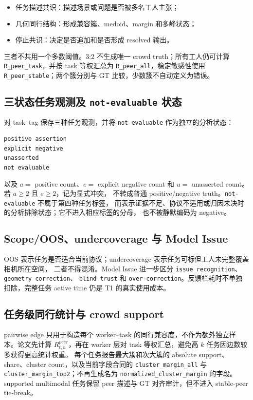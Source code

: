 \begin{itemize}
  \item 任务描述共识：描述场景或问题是否被多名工人主张；
  \item 几何同行结构：形成兼容簇、medoid、margin 和多峰状态；
  \item 停止共识：决定是否追加和是否形成 resolved 输出。
\end{itemize}

三者不共用一个多数阈值。3:2 不生成唯一 crowd truth；所有工人仍可计算
\texttt{R\_peer\_task}，并按 task 等权汇总为 \texttt{R\_peer\_all}，稳定敏感性使用
\texttt{R\_peer\_stable}；两个簇分别与 GT 比较，少数簇不自动定义为错误。

\subsection{三状态任务观测及 \texttt{not-evaluable} 状态}

对 task--tag 保存三种任务观测，并将 \texttt{not-evaluable} 作为独立的分析状态：

\begin{verbatim}
positive assertion
explicit negative
unasserted
not evaluable
\end{verbatim}

以及 \(a=\) positive count、\(e=\) explicit negative count 和
\(u=\) unasserted count。若 \(a\geq2\) 且 \(e\geq2\)，记为显式冲突，
不转成普通 positive/negative truth。\texttt{not-evaluable} 不属于第四种任务标签，
而表示证据不足、协议不适用或归因未决时的分析排除状态；它不进入相应标签的分母，
也不被静默编码为 negative。

\subsection{Scope/OOS、undercoverage 与 Model Issue}

OOS 表示任务是否适合当前协议；undercoverage 表示任务可标但工人未完整覆盖相机所在空间，
二者不得混淆。Model Issue 进一步区分 \texttt{issue recognition}、\texttt{geometry correction}、
\texttt{blind trust} 和 \texttt{over-correction}。反馈栏耗时不单独扣除，完整任务 active time
仍是 T1 的真实使用成本。

\subsection{任务级同行统计与 crowd support}

pairwise edge 只用于构造每个 worker--task 的同行兼容度，不作为额外独立样本。论文先计算
\(R^{peer}_{t,u}\)，再在 worker 层对 task 等权汇总，避免高 \(k\) 任务因边数较多获得更高统计权重。
每个任务报告最大簇和次大簇的 absolute support、share、cluster count，以及当前字段合同的
\texttt{cluster\_margin\_all} 与 \texttt{cluster\_margin\_top2}；不再生成名为
\texttt{normalized\_cluster\_margin} 的字段。supported multimodal 任务保留 peer 描述与 GT
对齐审计，但不进入 stable-peer tie-break。
